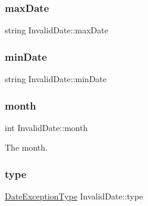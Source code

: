 \hypertarget{class_invalid_date_aa7a1be9dd6f1df990c62734800381c2a}{}\label{class_invalid_date_aa7a1be9dd6f1df990c62734800381c2a} 
\subsubsection{\texorpdfstring{max\+Date}{maxDate}}
{\footnotesize\ttfamily string Invalid\+Date\+::max\+Date\hspace{0.3cm}{\ttfamily [private]}}

\hypertarget{class_invalid_date_ae3e99c48b2b32f9f88f1393f1d331ac8}{}\label{class_invalid_date_ae3e99c48b2b32f9f88f1393f1d331ac8} 
\subsubsection{\texorpdfstring{min\+Date}{minDate}}
{\footnotesize\ttfamily string Invalid\+Date\+::min\+Date\hspace{0.3cm}{\ttfamily [private]}}

\hypertarget{class_invalid_date_a63d1eb8cc29192ed24a608efaf8bb841}{}\label{class_invalid_date_a63d1eb8cc29192ed24a608efaf8bb841} 
\subsubsection{\texorpdfstring{month}{month}}
{\footnotesize\ttfamily int Invalid\+Date\+::month\hspace{0.3cm}{\ttfamily [private]}}



The month. 

\hypertarget{class_invalid_date_a2ec333a89688d1f90713e647720ffda1}{}\label{class_invalid_date_a2ec333a89688d1f90713e647720ffda1} 
\subsubsection{\texorpdfstring{type}{type}}
{\footnotesize\ttfamily \hyperlink{_exceptions_8hpp_a3c07f150c56e3659483593a47dafc0e3}{Date\+Exception\+Type} Invalid\+Date\+::type\hspace{0.3cm}{\ttfamily [private]}}



